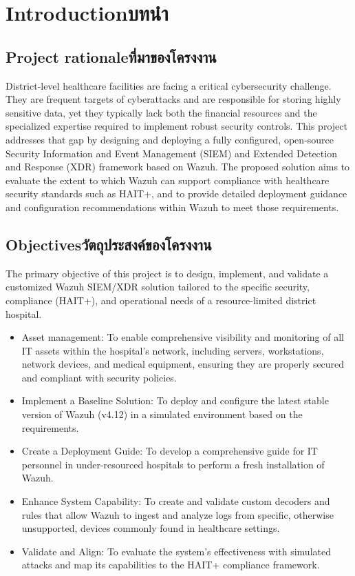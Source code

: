 \chapter{\ifenglish Introduction\else บทนำ\fi}

\section{\ifenglish Project rationale\else ที่มาของโครงงาน\fi}
    District‑level healthcare facilities are facing a critical cybersecurity challenge. They are frequent targets of cyberattacks and are responsible for storing highly sensitive data, yet they typically lack both the financial resources and the specialized expertise required to implement robust security controls. This project addresses that gap by designing and deploying a fully configured, open‑source Security Information and Event Management (SIEM) and Extended Detection and Response (XDR) framework based on Wazuh. The proposed solution aims to evaluate the extent to which Wazuh can support compliance with healthcare security standards such as HAIT+, and to provide detailed deployment guidance and configuration recommendations within Wazuh to meet those requirements.

\section{\ifenglish Objectives\else วัตถุประสงค์ของโครงงาน\fi}
    The primary objective of this project is to design, implement, and validate a customized Wazuh SIEM/XDR solution tailored to the specific security, compliance (HAIT+), and operational needs of a resource-limited district hospital.
\begin{itemize}

    \item {Asset management: To enable comprehensive visibility and monitoring of all IT assets within the hospital's network, including servers, workstations, network devices, and medical equipment, ensuring they are properly secured and compliant with security policies.}
    \item {Implement a Baseline Solution: To deploy and configure the latest stable version of Wazuh (v4.12) in a simulated environment based on the requirements.}
    \item {Create a Deployment Guide: To develop a comprehensive guide for IT personnel in under-resourced hospitals to perform a fresh installation of Wazuh.}
    \item {Enhance System Capability: To create and validate custom decoders and rules that allow Wazuh to ingest and analyze logs from specific, otherwise unsupported, devices commonly found in healthcare settings.}
    \item {Validate and Align: To evaluate the system's effectiveness with simulated attacks and map its capabilities to the HAIT+ compliance framework.}
    
\end{itemize}

